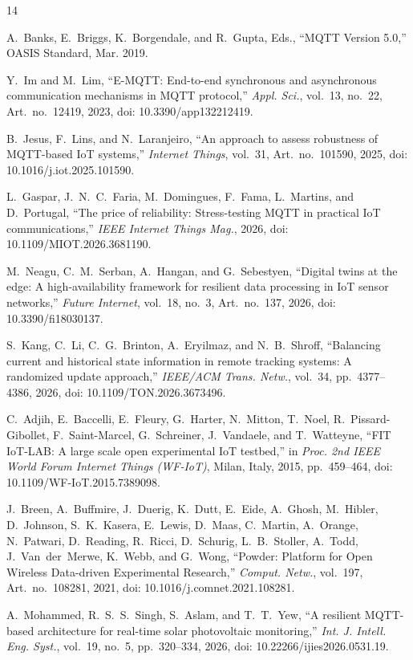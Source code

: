 \documentclass[journal]{IEEEtran}
\begin{document}
\begin{thebibliography}{14}

A.~Banks, E.~Briggs, K.~Borgendale, and R.~Gupta, Eds.,
``MQTT Version 5.0,'' OASIS Standard, Mar. 2019.

Y.~Im and M.~Lim,
``E-MQTT: End-to-end synchronous and asynchronous communication mechanisms in MQTT protocol,''
\emph{Appl. Sci.}, vol.~13, no.~22, Art.~no.~12419, 2023,
doi: 10.3390/app132212419.

B.~Jesus, F.~Lins, and N.~Laranjeiro,
``An approach to assess robustness of MQTT-based IoT systems,''
\emph{Internet Things}, vol.~31, Art.~no.~101590, 2025,
doi: 10.1016/j.iot.2025.101590.

L.~Gaspar, J.~N.~C.~Faria, M.~Domingues, F.~Fama, L.~Martins, and D.~Portugal,
``The price of reliability: Stress-testing MQTT in practical IoT communications,''
\emph{IEEE Internet Things Mag.}, 2026,
doi: 10.1109/MIOT.2026.3681190.

M.~Neagu, C.~M.~Serban, A.~Hangan, and G.~Sebestyen,
``Digital twins at the edge: A high-availability framework for resilient data processing in IoT sensor networks,''
\emph{Future Internet}, vol.~18, no.~3, Art.~no.~137, 2026,
doi: 10.3390/fi18030137.

S.~Kang, C.~Li, C.~G.~Brinton, A.~Eryilmaz, and N.~B.~Shroff,
``Balancing current and historical state information in remote tracking systems: A randomized update approach,''
\emph{IEEE/ACM Trans. Netw.}, vol.~34, pp.~4377--4386, 2026,
doi: 10.1109/TON.2026.3673496.

C.~Adjih, E.~Baccelli, E.~Fleury, G.~Harter, N.~Mitton, T.~Noel, R.~Pissard-Gibollet, F.~Saint-Marcel, G.~Schreiner, J.~Vandaele, and T.~Watteyne,
``FIT IoT-LAB: A large scale open experimental IoT testbed,''
in \emph{Proc. 2nd IEEE World Forum Internet Things (WF-IoT)}, Milan, Italy, 2015, pp.~459--464,
doi: 10.1109/WF-IoT.2015.7389098.

J.~Breen, A.~Buffmire, J.~Duerig, K.~Dutt, E.~Eide, A.~Ghosh, M.~Hibler, D.~Johnson, S.~K.~Kasera, E.~Lewis, D.~Maas, C.~Martin, A.~Orange, N.~Patwari, D.~Reading, R.~Ricci, D.~Schurig, L.~B.~Stoller, A.~Todd, J.~Van~der~Merwe, K.~Webb, and G.~Wong,
``Powder: Platform for Open Wireless Data-driven Experimental Research,''
\emph{Comput. Netw.}, vol.~197, Art.~no.~108281, 2021,
doi: 10.1016/j.comnet.2021.108281.


A.~Mohammed, R.~S.~S.~Singh, S.~Aslam, and T.~T.~Yew,
``A resilient MQTT-based architecture for real-time solar photovoltaic monitoring,''
\emph{Int. J. Intell. Eng. Syst.}, vol.~19, no.~5, pp.~320--334, 2026,
doi: 10.22266/ijies2026.0531.19.


\end{thebibliography}
\end{document}
